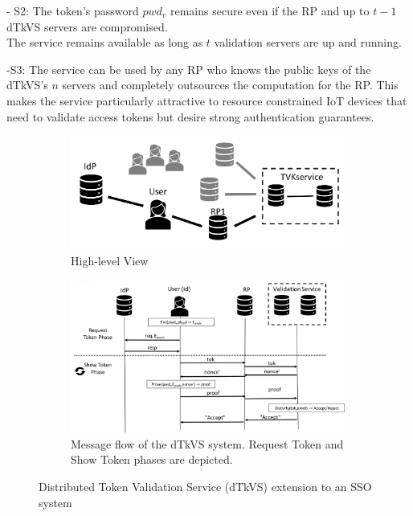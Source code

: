 \documentclass[conference]{IEEEtran}
\begin{document}
- S2: The token's password $pwd_v$ remains secure even if the RP and up to $t-1$ dTkVS servers are compromised.\\
The service remains available as long as $t$ validation servers are up and running.

-S3: The service can be used by any RP who knows the public keys of the dTkVS's $n$ servers and completely outsources the computation for the RP. 
This makes the service particularly attractive to resource constrained IoT devices that need to validate access tokens but desire strong authentication guarantees.


\begin{figure}
\centering
\begin{subfigure}{.4\textwidth}
  \centering
  \includegraphics[width=\textwidth]{Figures/general.jpeg}
  \caption{High-level View}
  \label{fig:sub1}
\end{subfigure}%
\begin{subfigure}{.6\textwidth}
  \centering
  \includegraphics[width=\textwidth]{Figures/sequencePbDTV.jpeg}
  \caption{Message flow of the dTkVS system. Request Token and Show Token phases are depicted.}
  \label{fig:sub2}
\end{subfigure}
\caption{Distributed Token Validation Service (dTkVS) extension to an SSO system}
\label{PbDTVFlow}
\end{figure}
\end{document}
